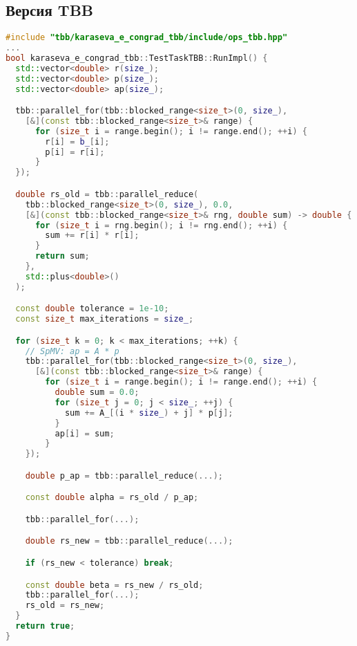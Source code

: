 \documentclass[12pt]{article}
\begin{document}
\subsection{Версия TBB}
\begin{lstlisting}[language=C++]
#include "tbb/karaseva_e_congrad_tbb/include/ops_tbb.hpp"
...
bool karaseva_e_congrad_tbb::TestTaskTBB::RunImpl() {
  std::vector<double> r(size_);
  std::vector<double> p(size_);
  std::vector<double> ap(size_);

  tbb::parallel_for(tbb::blocked_range<size_t>(0, size_), 
    [&](const tbb::blocked_range<size_t>& range) {
      for (size_t i = range.begin(); i != range.end(); ++i) {
        r[i] = b_[i];
        p[i] = r[i];
      }
  });

  double rs_old = tbb::parallel_reduce(
    tbb::blocked_range<size_t>(0, size_), 0.0,
    [&](const tbb::blocked_range<size_t>& rng, double sum) -> double {
      for (size_t i = rng.begin(); i != rng.end(); ++i) {
        sum += r[i] * r[i];
      }
      return sum;
    },
    std::plus<double>()
  );

  const double tolerance = 1e-10;
  const size_t max_iterations = size_;

  for (size_t k = 0; k < max_iterations; ++k) {
    // SpMV: ap = A * p
    tbb::parallel_for(tbb::blocked_range<size_t>(0, size_),
      [&](const tbb::blocked_range<size_t>& range) {
        for (size_t i = range.begin(); i != range.end(); ++i) {
          double sum = 0.0;
          for (size_t j = 0; j < size_; ++j) {
            sum += A_[(i * size_) + j] * p[j];
          }
          ap[i] = sum;
        }
    });

    double p_ap = tbb::parallel_reduce(...);

    const double alpha = rs_old / p_ap;

    tbb::parallel_for(...);

    double rs_new = tbb::parallel_reduce(...);

    if (rs_new < tolerance) break;

    const double beta = rs_new / rs_old;
    tbb::parallel_for(...);
    rs_old = rs_new;
  }
  return true;
}
\end{lstlisting}
\end{document}
